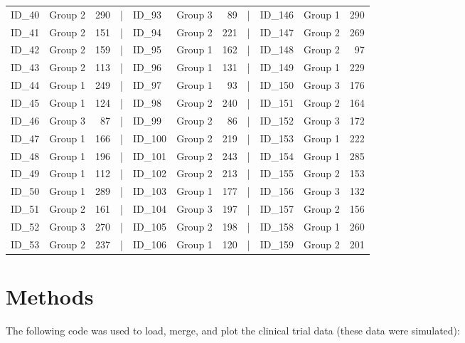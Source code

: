 \documentclass[smallextended]{svjour3}       %
\begin{document}
\begin{table}
\begin{tabular}[t]{llrlllrlllr}
ID\_40 & Group 2 & 290 & | & ID\_93 & Group 3 & 89 & | & ID\_146 & Group 1 & 290\\
\addlinespace
ID\_41 & Group 2 & 151 & | & ID\_94 & Group 2 & 221 & | & ID\_147 & Group 2 & 269\\
ID\_42 & Group 2 & 159 & | & ID\_95 & Group 1 & 162 & | & ID\_148 & Group 2 & 97\\
ID\_43 & Group 2 & 113 & | & ID\_96 & Group 1 & 131 & | & ID\_149 & Group 1 & 229\\
ID\_44 & Group 1 & 249 & | & ID\_97 & Group 1 & 93 & | & ID\_150 & Group 3 & 176\\
ID\_45 & Group 1 & 124 & | & ID\_98 & Group 2 & 240 & | & ID\_151 & Group 2 & 164\\
\addlinespace
ID\_46 & Group 3 & 87 & | & ID\_99 & Group 2 & 86 & | & ID\_152 & Group 3 & 172\\
ID\_47 & Group 1 & 166 & | & ID\_100 & Group 2 & 219 & | & ID\_153 & Group 1 & 222\\
ID\_48 & Group 1 & 196 & | & ID\_101 & Group 2 & 243 & | & ID\_154 & Group 1 & 285\\
ID\_49 & Group 1 & 112 & | & ID\_102 & Group 2 & 213 & | & ID\_155 & Group 2 & 153\\
ID\_50 & Group 1 & 289 & | & ID\_103 & Group 1 & 177 & | & ID\_156 & Group 3 & 132\\
\addlinespace
ID\_51 & Group 2 & 161 & | & ID\_104 & Group 3 & 197 & | & ID\_157 & Group 2 & 156\\
ID\_52 & Group 3 & 270 & | & ID\_105 & Group 2 & 198 & | & ID\_158 & Group 1 & 260\\
ID\_53 & Group 2 & 237 & | & ID\_106 & Group 1 & 120 & | & ID\_159 & Group 2 & 201\\
\bottomrule
\end{tabular}
\end{table}

\hypertarget{methods}{%
\section{Methods}\label{methods}}

The following code was used to load, merge, and plot the clinical trial data (these data were simulated):
\end{document}

